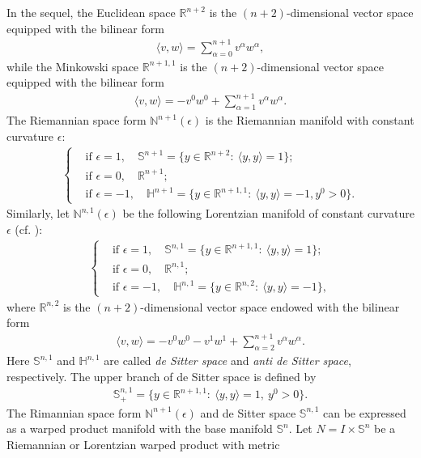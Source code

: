 \documentclass[11pt,reqno]{amsart}
\theoremstyle{definition}
\theoremstyle{remark}
\numberwithin{equation}{section}
\renewcommand{\(}{\left(}
\renewcommand{\)}{\right)}
\renewcommand{\~}{\tilde}
\renewcommand{\-}{\overline}
\renewcommand{\a}{\alpha}
\newcommand{\e}{\epsilon}
\begin{document}
In the sequel, the Euclidean space $\mathbb R^{n+2}$ is the $(n+2)$-dimensional vector space equipped with the bilinear form
\begin{align*}
\langle v,w\rangle=\sum_{\a=0}^{n+1}v^\a w^\a,
\end{align*}
while the Minkowski space $\mathbb R^{n+1,1}$ is the $(n+2)$-dimensional vector space equipped with the bilinear form
\begin{align*}
\langle v,w\rangle=-v^0w^0+\sum_{\a=1}^{n+1}v^\a w^\a.
\end{align*}
The Riemannian space form $\mathbb N^{n+1}(\e)$ is the Riemannian manifold with constant curvature $\e$:
\begin{align*}
\left\{\begin{aligned}
&\text{if $\e=1$}, \quad  \mathbb S^{n+1}=\{ y \in \mathbb R^{n+2} :~ \langle y,y\rangle=1\};\\
&\text{if $\e=0$}, \quad  \mathbb R^{n+1};\\
&\text{if $\e=-1$}, \quad \mathbb H^{n+1}=\{ y\in \mathbb R^{n+1,1} :~ \langle y,y\rangle=-1,y^0>0\}.
\end{aligned}\right.
\end{align*}
Similarly, let $\mathbb N^{n,1}(\e)$ be the following Lorentzian manifold of constant curvature $\e$ (cf. \cite[P. 110,228]{Oneil1983}):
\begin{align*}
\left\{\begin{aligned}
&\text{if $\e=1$}, \quad \mathbb S^{n,1}=\{y\in \mathbb R^{n+1,1} :~ \langle y,y\rangle=1\};\\
&\text{if $\e=0$}, \quad  \mathbb R^{n,1};\\
&\text{if $\e=-1$}, \quad \mathbb H^{n,1}=\{ y\in \mathbb R^{n,2} :~ \langle y,y\rangle=-1\},
\end{aligned}\right.
\end{align*}
where $\mathbb R^{n,2}$ is the $(n+2)$-dimensional vector space endowed with the bilinear form 
\begin{align*}
\langle v,w\rangle=-v^0 w^0-v^{1}w^{1}+\sum_{\a=2}^{n+1}v^\a w^\a.
\end{align*}
Here $\mathbb S^{n,1}$ and $\mathbb H^{n,1}$ are called {\em de Sitter space} and {\em anti de Sitter space}, respectively. The upper branch of de Sitter space is defined by
\begin{align*}
\mathbb S^{n,1}_{+}=\{ y\in \mathbb R^{n+1,1}:~\langle y,y\rangle=1, ~y^0>0 \}.
\end{align*}
The Rimannian space form $\mathbb N^{n+1}(\e)$ and de Sitter space $\mathbb S^{n,1}$ can be expressed as a warped product manifold with the base manifold $\mathbb S^n$. Let $N=I \times \mathbb S^n$ be a Riemannian or Lorentzian warped product with metric 
\end{document}

